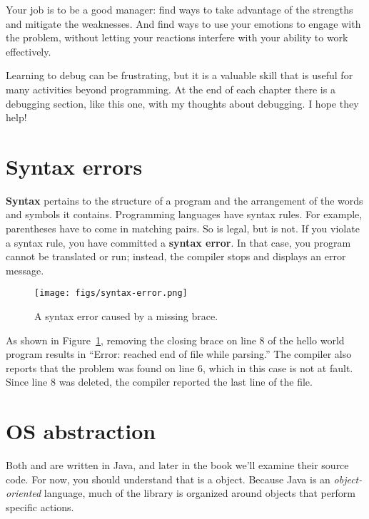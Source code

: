 Your job is to be a good manager: find ways to take advantage of the strengths and mitigate the weaknesses.
And find ways to use your emotions to engage with the problem, without letting your reactions interfere with your ability to work effectively.

Learning to debug can be frustrating, but it is a valuable skill that is useful for many activities beyond programming.
At the end of each chapter there is a debugging section, like this one, with my thoughts about debugging.
I hope they help!


\section{Syntax errors}


{\bf Syntax} pertains to the structure of a program and the arrangement of the words and symbols it contains.
Programming languages have syntax rules.
For example, parentheses have to come in matching pairs.
So  is legal, but  is not.
If you violate a syntax rule, you have committed a {\bf syntax error}.
In that case, you program cannot be translated or run; instead, the compiler stops and displays an error message.

\begin{figure}[!h]
\begin{center}
\texttt{[image: figs/syntax-error.png]}
\caption{A syntax error caused by a missing brace.}
\label{fig:syntax}
\end{center}
\end{figure}

As shown in Figure~\ref{fig:syntax}, removing the closing brace on line 8 of the hello world program results in ``Error: reached end of file while parsing.''
The compiler also reports that the problem was found on line 6, which in this case is not at fault.
Since line 8 was deleted, the compiler reported the last line of the file.


\section{OS abstraction}


Both  and  are written in Java, and later in the book we'll examine their source code.
For now, you should understand that  is a  object.
Because Java is an {\em object-oriented} language, much of the library is organized around objects that perform specific actions.

